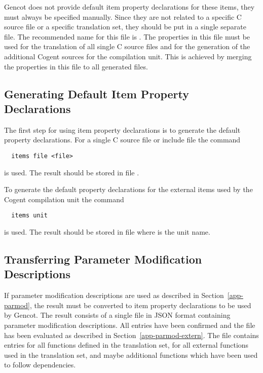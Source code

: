Gencot does not provide default item property declarations for these items, they must always be specified manually. Since they 
are not related to a specific C source file or a specific translation set, they should be put in a single separate file. The 
recommended name for this file is . The properties in this file must be used for the translation 
of all single C source files and for the generation of the additional Cogent sources for the compilation unit. This is 
achieved by merging the properties in this file to all generated  files.

\subsection{Generating Default Item Property Declarations}
\label{app-itemprops-default}

The first step for using item property declarations is to generate the default property declarations. For a single C source 
file or include file  the command
\begin{verbatim}
  items file <file>
\end{verbatim}
is used. The result should be stored in file .

To generate the default property declarations for the external items used by the Cogent compilation unit the command
\begin{verbatim}
  items unit
\end{verbatim}
is used. The result should be stored in file  where  is the unit name. 

\subsection{Transferring Parameter Modification Descriptions}
\label{app-itemprops-parmod}

If parameter modification descriptions are used as described in Section~\ref{app-parmod}, the result must be converted to item
property declarations to be used by Gencot. The result consists of a single file  in JSON format containing 
parameter modification descriptions. All entries have been confirmed and the file has been evaluated as described in 
Section~\ref{app-parmod-extern}. The file contains entries for all functions defined in the translation set, for all external 
functions used in the translation set, and maybe additional functions which have been used to follow dependencies.

